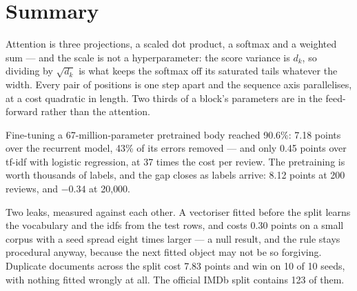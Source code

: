 \documentclass[11pt,a4paper]{article}
\begin{document}
\section*{Summary}

Attention is three projections, a scaled dot product, a softmax and a weighted
sum --- and the scale is not a hyperparameter: the score variance is $d_k$, so
dividing by $\sqrt{d_k}$ is what keeps the softmax off its saturated tails
whatever the width. Every pair of positions is one step apart and the sequence
axis parallelises, at a cost quadratic in length. Two thirds of a block's
parameters are in the feed-forward rather than the attention.

Fine-tuning a 67-million-parameter pretrained body reached 90.6\%: 7.18 points
over the recurrent model, 43\% of its errors removed --- and only 0.45 points
over tf-idf with logistic regression, at 37 times the cost per review. The
pretraining is worth thousands of labels, and the gap closes as labels arrive:
8.12 points at 200 reviews, and $-0.34$ at 20{,}000.

Two leaks, measured against each other. A vectoriser fitted before the split
learns the vocabulary and the idfs from the test rows, and costs 0.30 points on
a small corpus with a seed spread eight times larger --- a null result, and the
rule stays procedural anyway, because the next fitted object may not be so
forgiving. Duplicate documents across the split cost 7.83 points and win on 10
of 10 seeds, with nothing fitted wrongly at all. The official IMDb split
contains 123 of them.
\end{document}

